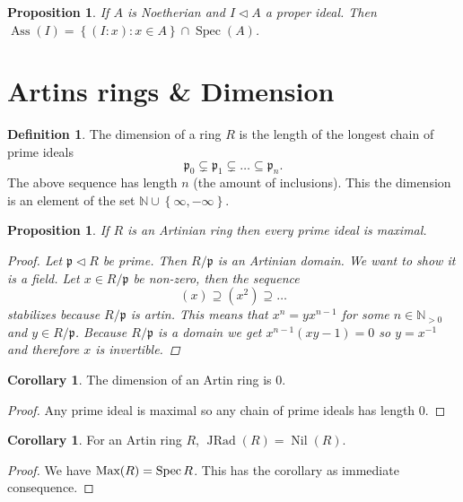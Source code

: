 \documentclass{article}
\newcommand{\N}{\mathbb{N}}
\newcommand{\set}[1]{\left\{#1\right\}}
\newcommand{\setwith}[2]{\left\{#1:#2\right\}}
\DeclareMathOperator{\nil}{Nil}
\DeclareMathOperator{\JRad}{JRad}
\DeclareMathOperator{\Ass}{Ass}
\DeclareMathOperator{\Spec}{Spec}
\newcommand{\primeid}{\mathfrak{p}}
\newcommand{\ideal}{\triangleleft}
\newtheorem{proposition}[theorem]{Proposition}
\theoremstyle{definition}
\newtheorem{definition}[theorem]{Definition}
\newtheorem{corollary}[theorem]{Corollary}
\begin{document}
\begin{proposition}
    If \(A\) is Noetherian and \(I\ideal A\) a proper ideal. Then
    \(\Ass(I)=\setwith{(I:x)}{x\in A}\cap\Spec(A)\).
\end{proposition}

\section{Artins rings \& Dimension}
\begin{definition}
    The dimension of a ring \(R\) is the length of the longest chain of prime
    ideals
    \[
        \primeid_{0}\subsetneq \primeid_{1}\subsetneq\ldots\subseteq \primeid_{n}.
    \]
    The above sequence has length \(n\) (the amount of inclusions). This the
    dimension is an element of the set \(\N\cup\set{\infty,-\infty}\).
\end{definition}

\begin{proposition}
    If \(R\) is an Artinian ring then every prime ideal is maximal.

    \begin{proof}
        Let \(\primeid\ideal R\) be prime. Then \(R/\primeid\) is an Artinian
        domain. We want to show it is a field. Let \(x\in R/\primeid\) be
        non-zero, then the sequence
        \[
            (x)\supseteq(x^{2})\supseteq\ldots
        \]
        stabilizes because \(R/\primeid\) is artin. This means that
        \(x^{n}=yx^{n-1}\) for some \(n\in\N_{>0}\) and \(y\in R/\primeid\).
        Because \(R/\primeid\) is a domain we get \(x^{n-1}(xy-1)=0\) so
        \(y=x^{-1}\) and therefore \(x\) is invertible.
    \end{proof}
\end{proposition}

\begin{corollary}
    The dimension of an Artin ring is \(0\).

    \begin{proof}
        Any prime ideal is maximal so any chain of prime ideals has length
        \(0\).
    \end{proof}
\end{corollary}

\begin{corollary}
    For an Artin ring \(R\), \(\JRad(R)=\nil(R)\).

    \begin{proof}
        We have \(\textnormal{Max}(R)=\Spec{R}\). This has the corollary as
        immediate consequence.
    \end{proof}
\end{corollary}
\end{document}
